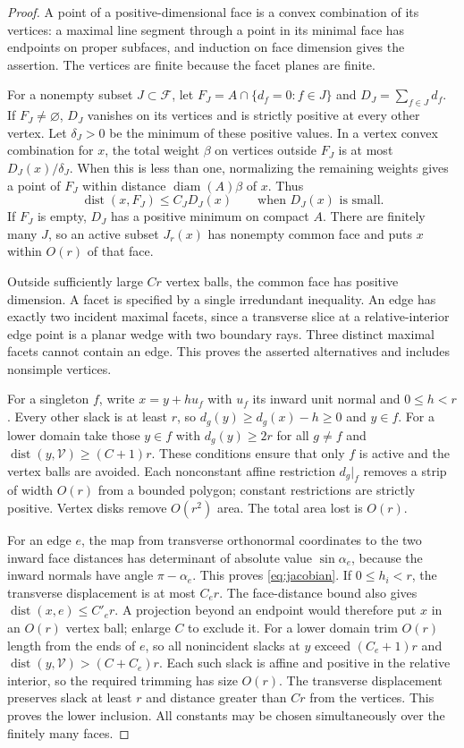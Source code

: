 \documentclass[11pt]{article}
\DeclareMathOperator{\dist}{dist}
\begin{document}
\begin{proof}
A point of a positive-dimensional face is a convex combination of its
vertices: a maximal line segment through a point in its minimal face has
endpoints on proper subfaces, and induction on face dimension gives the
assertion. The vertices are finite because the facet planes are finite.

For a nonempty subset $J\subset\mathcal F$, let
$F_J=A\cap\{d_f=0:f\in J\}$ and $D_J=\sum_{f\in J}d_f$.
If $F_J\ne\varnothing$, $D_J$ vanishes on its vertices and is strictly
positive at every other vertex. Let $\delta_J>0$ be the minimum of these
positive values. In a vertex convex combination for $x$, the total weight
$\beta$ on vertices outside $F_J$ is at most $D_J(x)/\delta_J$.
When this is less than one, normalizing the remaining weights gives a
point of $F_J$ within distance $\operatorname{diam}(A)\beta$ of $x$.
Thus
\[
 \dist(x,F_J)\leq C_JD_J(x)\qquad\text{when }D_J(x)\text{ is small}.
\]
If $F_J$ is empty, $D_J$ has a positive minimum on compact $A$.
There are finitely many $J$, so an active subset $J_r(x)$ has nonempty
common face and puts $x$ within $O(r)$ of that face.

Outside sufficiently large $Cr$ vertex balls, the common face has
positive dimension. A facet is specified by a single irredundant
inequality. An edge has exactly two incident maximal facets, since a
transverse slice at a relative-interior edge point is a planar wedge
with two boundary rays. Three distinct maximal facets cannot contain an
edge. This proves the asserted alternatives and includes nonsimple vertices.

For a singleton $f$, write $x=y+h u_f$ with $u_f$ its inward unit normal
and $0\leq h<r$. Every other slack is at least $r$, so
$d_g(y)\geq d_g(x)-h\geq0$ and $y\in f$.
For a lower domain take those $y\in f$ with $d_g(y)\geq2r$ for all
$g\ne f$ and $\dist(y,\mathcal V)\geq(C+1)r$.
These conditions ensure that only $f$ is active and the vertex balls
are avoided. Each nonconstant affine restriction $d_g|_f$ removes a
strip of width $O(r)$ from a bounded polygon; constant restrictions are
strictly positive. Vertex disks remove $O(r^2)$ area. The total area lost is
$O(r)$.

For an edge $e$, the map from transverse orthonormal coordinates to the
two inward face distances has determinant of absolute value
$\sin\alpha_e$, because the inward normals have angle $\pi-\alpha_e$.
This proves \eqref{eq:jacobian}. If $0\leq h_i<r$, the transverse
displacement is at most $C_er$. The face-distance bound also gives
$\dist(x,e)\leq C'_er$. A projection beyond an endpoint would therefore
put $x$ in an $O(r)$ vertex ball; enlarge $C$ to exclude it.
For a lower domain trim $O(r)$ length from the ends of $e$, so all
nonincident slacks at $y$ exceed $(C_e+1)r$ and
$\dist(y,\mathcal V)>(C+C_e)r$. Each such slack is affine and positive
in the relative interior, so the required trimming has size $O(r)$.
The transverse displacement preserves slack at least $r$ and distance
greater than $Cr$ from the vertices. This proves the lower inclusion.
All constants may be chosen simultaneously over the finitely many faces.
\end{proof}
\end{document}
